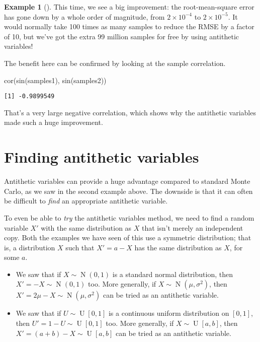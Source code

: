 \documentclass[
  letterpaper,
  DIV=11,
  numbers=noendperiod]{scrreprt}
\newenvironment{Shaded}{\begin{snugshade}}{\end{snugshade}}
\newcommand{\FunctionTok}[1]{\textcolor[rgb]{0.28,0.35,0.67}{#1}}
\newcommand{\NormalTok}[1]{\textcolor[rgb]{0.00,0.23,0.31}{#1}}
\theoremstyle{plain}
\theoremstyle{definition}
\theoremstyle{definition}
\newtheorem{example}{Example}[chapter]
\theoremstyle{remark}
\begin{document}
\begin{example}[]
This time, we see a big improvement: the root-mean-square error has gone
down by a whole order of magnitude, from
\(\ensuremath{2\times 10^{-4}}\) to \(\ensuremath{2\times 10^{-5}}\). It
would normally take 100 times as many samples to reduce the RMSE by a
factor of 10, but we've got the extra 99 million samples for free by
using antithetic variables!

The benefit here can be confirmed by looking at the sample correlation.

\begin{Shaded}
\begin{Highlighting}[]
\FunctionTok{cor}\NormalTok{(}\FunctionTok{sin}\NormalTok{(samples1), }\FunctionTok{sin}\NormalTok{(samples2))}
\end{Highlighting}
\end{Shaded}

\begin{verbatim}
[1] -0.9899549
\end{verbatim}

That's a very large negative correlation, which shows why the antithetic
variables made such a huge improvement.

\end{example}

\section{Finding antithetic
variables}\label{finding-antithetic-variables}

Antithetic variables can provide a huge advantage compared to standard
Monte Carlo, as we saw in the second example above. The downside is that
it can often be difficult to \emph{find} an appropriate antithetic
variable.

To even be able to \emph{try} the antithetic variables method, we need
to find a random variable \(X'\) with the same distribution as \(X\)
that isn't merely an independent copy. Both the examples we have seen of
this use a symmetric distribution; that is, a distribution \(X\) such
that \(X' = a - X\) has the same distribution as \(X\), for some \(a\).

\begin{itemize}
\item
  We saw that if \(X \sim \operatorname{N}(0, 1)\) is a standard normal
  distribution, then \(X' = -X \sim \operatorname{N}(0, 1)\) too. More
  generally, if \(X\sim \operatorname{N}(\mu, \sigma^2)\), then
  \(X' = 2\mu - X \sim \operatorname{N}(\mu, \sigma^2)\) can be tried as
  an antithetic variable.
\item
  We saw that if \(U \sim \operatorname{U}[0, 1]\) is a continuous
  uniform distribution on \([0,1]\), then
  \(U' = 1-U \sim \operatorname{U}[0, 1]\) too. More generally, if
  \(X\sim \operatorname{U}[a, b]\), then
  \(X' = (a + b) - X \sim \operatorname{U}[a, b]\) can be tried as an
  antithetic variable.
\end{itemize}
\end{document}
